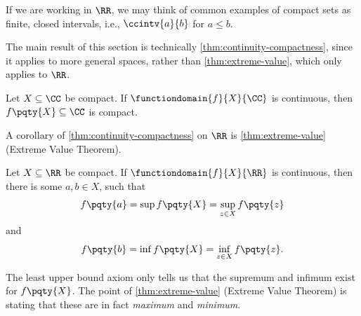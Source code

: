 \begin{remark}
    If we are working in \(\RR\), we may think of common examples of compact sets as finite, closed intervals, i.e., \(\ccintv{a}{b}\) for \(a \leq b\).
\end{remark}

The main result of this section is technically \autoref{thm:continuity-compactness}, since it applies to more general spaces, rather than \autoref{thm:extreme-value}, which only applies to \(\RR\).

\begin{theorem}
    \label{thm:continuity-compactness}%
    Let \(X \subseteq \CC\) be compact. If \(\functiondomain{f}{X}{\CC}\) is continuous, then \(f\pqty{X} \subseteq \CC\) is compact.
\end{theorem}

A corollary of \autoref{thm:continuity-compactness} on \(\RR\) is \autoref{thm:extreme-value} (Extreme Value Theorem).

\begin{theorem}
    \label{thm:extreme-value}%
    Let \(X \subseteq \RR\) be compact. If \(\functiondomain{f}{X}{\RR}\) is continuous, then there is some \(a, b \in X\), such that
    \[
        f\pqty{a} = \sup f\pqty{X} = \sup_{z \in X} f\pqty{z}
    \]
    and
    \[
        f\pqty{b} = \inf f\pqty{X} = \inf_{z \in X} f\pqty{z}.
    \]
\end{theorem}

\begin{remark}
    The least upper bound axiom only tells us that the supremum and infimum exist for \(f\pqty{X}\). The point of \autoref{thm:extreme-value} (Extreme Value Theorem) is stating that these are in fact \emph{maximum} and \emph{minimum}.
\end{remark}

